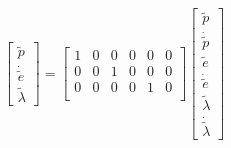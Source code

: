 \[
    \begin{bmatrix}
    \tilde{p}\\
    \dot{\tilde{e}}\\
    \tilde{\lambda}
    \end{bmatrix}
=
    \begin{bmatrix}
    1 & 0 & 0 & 0 & 0 & 0\\
    0 & 0 & 1 & 0 & 0 & 0\\
    0 & 0 & 0 & 0 & 1 & 0\\
    \end{bmatrix}
 \begin{bmatrix}
    \tilde p \\
    \dot{\tilde{p}}\\
    \tilde{e}\\
    \dot{\tilde e}\\
    \tilde{\lambda}\\
    \dot{\tilde{\lambda}}
 \end{bmatrix}
\]

